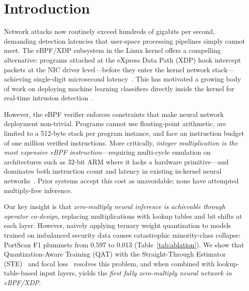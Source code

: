 \documentclass[sigconf,nonacm]{acmart}
\begin{document}
\maketitle

\section{Introduction}\label{sec:intro}

Network attacks now routinely exceed hundreds of gigabits per second,
demanding detection latencies that user-space processing pipelines
simply cannot meet.
The eBPF/XDP subsystem in the Linux kernel offers a compelling
alternative: programs attached at the eXpress Data Path (XDP) hook
intercept packets at the NIC driver level---before they enter the
kernel network stack---achieving single-digit microsecond
latency~\cite{zhang2024dsn}.
This has motivated a growing body of work on deploying machine learning
classifiers directly inside the kernel for real-time intrusion
detection~\cite{bachl2021dt, hara2023nn, zhang2024dsn, osaki2024,
chen2025kd}.

However, the eBPF verifier enforces constraints that make neural
network deployment non-trivial.
Programs cannot use floating-point arithmetic, are limited to a
512-byte stack per program instance, and face an instruction budget of
one million verified instructions.
More critically, \emph{integer multiplication is the most expensive
eBPF instruction}---requiring multi-cycle emulation on architectures
such as 32-bit ARM where it lacks a hardware primitive---and dominates
both instruction count and latency in existing in-kernel neural
networks~\cite{zhang2024dsn, hara2023nn}.
Prior systems accept this cost as unavoidable; none have attempted
multiply-free inference.

Our key insight is that \emph{zero-multiply neural inference is
achievable through operator co-design}, replacing multiplications with
lookup tables and bit shifts at each layer.
However, naively applying ternary weight quantization to models trained
on imbalanced security data causes catastrophic minority-class collapse:
PortScan F1 plummets from 0.597 to 0.013 (Table~\ref{tab:ablation}).
We show that Quantization-Aware Training (QAT) with the
Straight-Through Estimator (STE)~\cite{bengio2013ste} and focal
loss~\cite{lin2017focal} resolves this problem, and when combined with
lookup-table-based input layers, yields the \emph{first fully
zero-multiply neural network in eBPF/XDP}.
\end{document}
